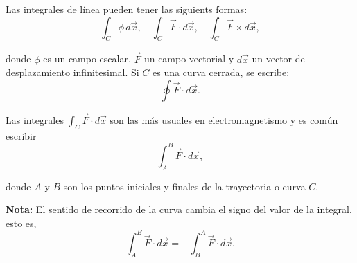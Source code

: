 Las integrales de línea pueden tener las siguients formas:
\begin{equation*}
\int_C \phi \, d\vec{x}, \quad \int_C \vec{F} \cdot d\vec{x}, \quad \int_C \vec{F} \times d\vec{x},
\end{equation*}

donde $\phi$ es un campo escalar, $\vec{F}$ un campo vectorial y $d\vec{x}$ un vector de desplazamiento infinitesimal. Si $C$ es una curva cerrada, se escribe: 
$$\oint \vec{F} \cdot d\vec{x}.$$

Las integrales $\int_C \vec{F} \cdot d\vec{x}$ son las más usuales en electromagnetismo y es común escribir
$$\int_A^B \Vec{F} \cdot d\vec{x},$$

donde $A$ y $B$ son los puntos iniciales y finales de la trayectoria o curva $C$.

\textbf{Nota:} El sentido de recorrido de la curva cambia el signo del valor de la integral, esto es,
$$\int_A^B \Vec{F} \cdot d\Vec{x} = - \int_B^A \Vec{F} \cdot d\Vec{x}. $$


